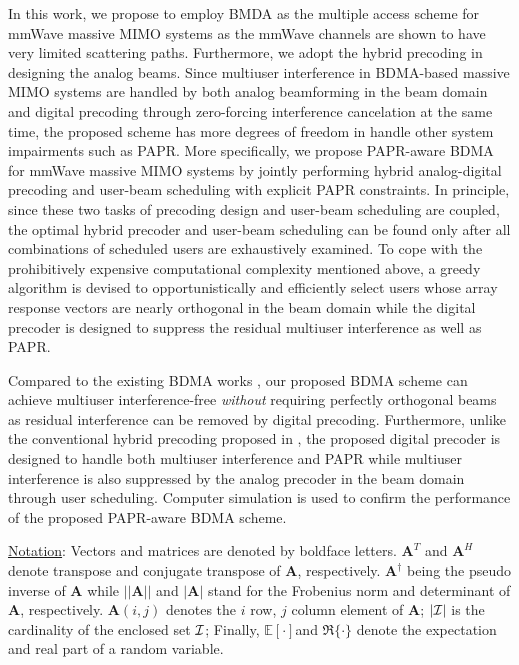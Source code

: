 \documentclass[conference]{IEEEtran}
\begin{document}
In this work, we propose to employ BMDA as the multiple access scheme for mmWave massive MIMO systems as the mmWave channels are shown to have very limited scattering paths. Furthermore, we adopt the hybrid precoding in designing the analog beams. Since multiuser interference in BDMA-based massive MIMO systems are handled by both analog beamforming in the beam domain and digital precoding through zero-forcing interference cancelation at the same time, the proposed scheme has more degrees of freedom in handle other system impairments such as PAPR. More specifically, we propose PAPR-aware BDMA for mmWave massive MIMO systems by jointly performing hybrid analog-digital precoding and user-beam scheduling with explicit PAPR constraints. In principle, since these two tasks of precoding design and user-beam scheduling are coupled, the optimal hybrid precoder and user-beam scheduling can be found only after all combinations of scheduled users are exhaustively examined. To cope with the prohibitively expensive computational complexity mentioned above, a greedy algorithm is devised to opportunistically and efficiently select users whose array response vectors are nearly orthogonal in the beam domain while the digital precoder is designed to suppress the residual multiuser interference as well as PAPR.

Compared to the existing BDMA works \cite{sun2015beam, Jiang2018}, our proposed BDMA scheme can achieve multiuser interference-free {\em without} requiring perfectly orthogonal beams as residual interference can be removed by digital precoding. Furthermore, unlike the conventional hybrid precoding proposed in \cite{alkhateeb2014channel}, the proposed digital precoder is designed to handle both multiuser interference and PAPR while multiuser interference is also suppressed by the analog precoder in the beam domain through user scheduling. Computer simulation is used to confirm the performance of the proposed PAPR-aware BDMA scheme.

\underline{Notation}: Vectors and matrices are denoted by boldface letters. ${\bm A}^T$ and ${\bm A}^H$ denote transpose and conjugate transpose of ${\bm A}$, respectively. $\bm{A}^\dagger$ being the pseudo inverse of $\bm{A}$ while $||\bm{A}|| $ and $|\bm{A}|$ stand for the Frobenius norm and determinant of ${\bm A}$, respectively. $\bm{A}(i,j)$ denotes the $i$ row, $j$ column element of ${\bm A}$; $|\cal{I}|$ is the cardinality of the enclosed set ${\cal I}$; Finally, $\mathbb{E}[ \cdot] $and $\Re\{\cdot\}$ denote the expectation and real part of a random variable.
\end{document}
